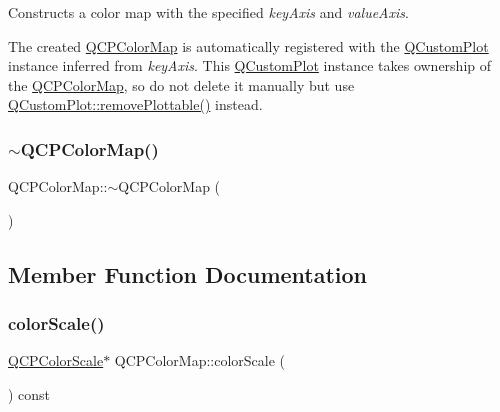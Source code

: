 Constructs a color map with the specified {\itshape key\+Axis} and {\itshape value\+Axis}.

The created \mbox{\hyperlink{class_q_c_p_color_map}{Q\+C\+P\+Color\+Map}} is automatically registered with the \mbox{\hyperlink{class_q_custom_plot}{Q\+Custom\+Plot}} instance inferred from {\itshape key\+Axis}. This \mbox{\hyperlink{class_q_custom_plot}{Q\+Custom\+Plot}} instance takes ownership of the \mbox{\hyperlink{class_q_c_p_color_map}{Q\+C\+P\+Color\+Map}}, so do not delete it manually but use \mbox{\hyperlink{class_q_custom_plot_af3dafd56884208474f311d6226513ab2}{Q\+Custom\+Plot\+::remove\+Plottable()}} instead. \mbox{\label{class_q_c_p_color_map_ac8a952a40fed62dcee33405b0f4d47ad}} 
\subsubsection{\texorpdfstring{$\sim$QCPColorMap()}{~QCPColorMap()}}
{\footnotesize\ttfamily Q\+C\+P\+Color\+Map\+::$\sim$\+Q\+C\+P\+Color\+Map (\begin{DoxyParamCaption}{ }\end{DoxyParamCaption})\hspace{0.3cm}{\ttfamily [virtual]}}



\subsection{Member Function Documentation}
\mbox{\label{class_q_c_p_color_map_a9d37d08c467ac645b86fc71a3b151208}} 
\subsubsection{\texorpdfstring{colorScale()}{colorScale()}}
{\footnotesize\ttfamily \mbox{\hyperlink{class_q_c_p_color_scale}{Q\+C\+P\+Color\+Scale}}$\ast$ Q\+C\+P\+Color\+Map\+::color\+Scale (\begin{DoxyParamCaption}{ }\end{DoxyParamCaption}) const\hspace{0.3cm}{\ttfamily [inline]}}

